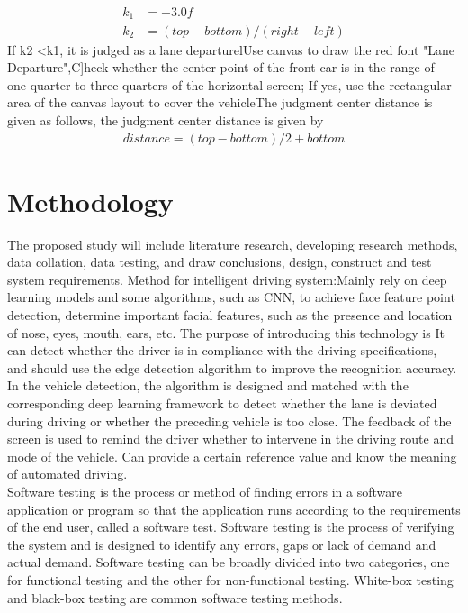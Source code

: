 \documentclass[12pt, a4paper]{article}
\begin{document}
\begin{align}
  k_1 &= -3.0f\\
  k_2 &= (top - bottom) / (right - left)
\end{align}
If k2 <k1, it is judged as a lane departurelUse canvas to draw the red font "Lane Departure",C]heck whether the center point of the front car is in the range of one-quarter to three-quarters of the horizontal screen; If yes, use the rectangular area of the canvas layout to cover the vehicleThe judgment center distance is given as follows, the judgment center distance is given by
\begin{align}
  distance = (top - bottom) / 2 + bottom
\end{align}


\section*{Methodology}
The proposed study will include literature research, developing research methods, data collation, data testing, and draw conclusions, design, construct and test system requirements. Method for intelligent driving system:Mainly rely on deep learning models and some algorithms, such as CNN, to achieve face feature point detection, determine important facial features, such as the presence and location of nose, eyes, mouth, ears, etc. The purpose of introducing this technology is It can detect whether the driver is in compliance with the driving specifications, and should use the edge detection algorithm to improve the recognition accuracy. In the vehicle detection, the algorithm is designed and matched with the corresponding deep learning framework to detect whether the lane is deviated during driving or whether the preceding vehicle is too close. The feedback of the screen is used to remind the driver whether to intervene in the driving route and mode of the vehicle. Can provide a certain reference value and know the meaning of automated driving.\\
Software testing is the process or method of finding errors in a software application or program so that the application runs according to the requirements of the end user, called a software test. Software testing is the process of verifying the system and is designed to identify any errors, gaps or lack of demand and actual demand. Software testing can be broadly divided into two categories, one for functional testing and the other for non-functional testing. White-box testing and black-box testing are common software testing methods.
\end{document}
